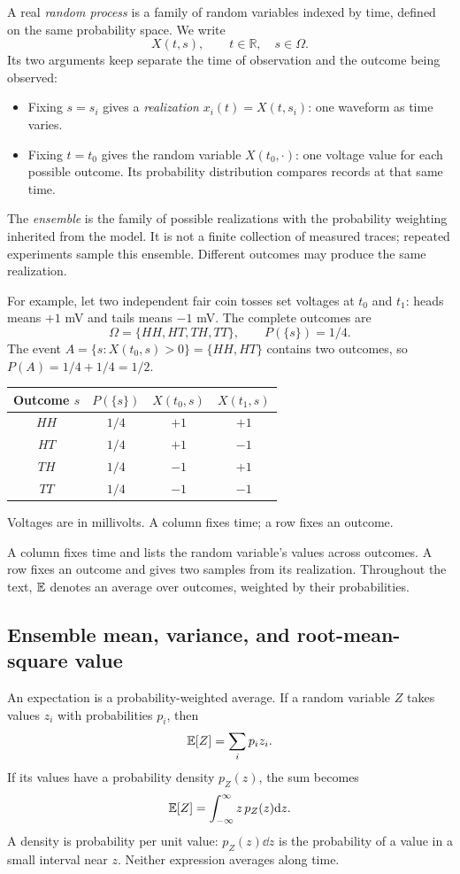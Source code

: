 A real \emph{random process} is a family of random variables indexed by time, defined on the same probability space. We write
\begin{equation}
X(t,s),\qquad t\in\mathbb R,\quad s\in\Omega.
\label{eq:process}
\end{equation}
Its two arguments keep separate the time of observation and the outcome being observed:
\begin{itemize}
\item Fixing $s=s_i$ gives a \emph{realization} $x_i(t)=X(t,s_i)$: one waveform as time varies.
\item Fixing $t=t_0$ gives the random variable $X(t_0,\cdot)$: one voltage value for each possible outcome. Its probability distribution compares records at that same time.
\end{itemize}
The \emph{ensemble} is the family of possible realizations with the probability weighting inherited from the model. It is not a finite collection of measured traces; repeated experiments sample this ensemble. Different outcomes may produce the same realization.

\RealizationFigure

For example, let two independent fair coin tosses set voltages at $t_0$ and $t_1$: heads means $+1$ mV and tails means $-1$ mV. The complete outcomes are
\[
\Omega=\{HH,HT,TH,TT\},\qquad P(\{s\})=1/4.
\]
The event $A=\{s:X(t_0,s)>0\}=\{HH,HT\}$ contains two outcomes, so $P(A)=1/4+1/4=1/2$.
\begin{center}
\begin{tabular}{cccc}\toprule
Outcome $s$ & $P(\{s\})$ & $X(t_0,s)$ & $X(t_1,s)$\\\midrule
$HH$ & $1/4$ & $+1$ & $+1$\\
$HT$ & $1/4$ & $+1$ & $-1$\\
$TH$ & $1/4$ & $-1$ & $+1$\\
$TT$ & $1/4$ & $-1$ & $-1$\\\bottomrule
\end{tabular}\par\vspace{2mm}
{\small Voltages are in millivolts. A column fixes time; a row fixes an outcome.}
\end{center}
A column fixes time and lists the random variable's values across outcomes. A row fixes an outcome and gives two samples from its realization. Throughout the text, $\mathbb E$ denotes an average over outcomes, weighted by their probabilities.

\subsection{Ensemble mean, variance, and root-mean-square value}
An expectation is a probability-weighted average. If a random variable $Z$ takes values $z_i$ with probabilities $p_i$, then
\[
\mathbb E[Z]=\sum_i p_i z_i.
\]
If its values have a probability density $p_Z(z)$, the sum becomes
\[
\mathbb E[Z]=\int_{-\infty}^{\infty}z\,p_Z(z)\mathrm d z.
\]
A density is probability per unit value: $p_Z(z)\dd z$ is the probability of a value in a small interval near $z$. Neither expression averages along time.

